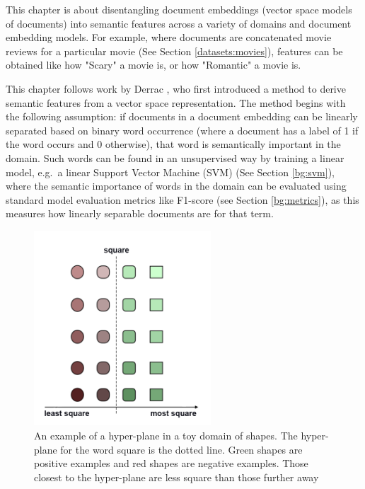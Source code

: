 
This chapter is about disentangling document embeddings (vector space models of documents) into semantic features across a variety of domains and document embedding models. For example, where documents are concatenated movie reviews for a particular movie (See Section \ref{datasets:movies}), features can be obtained like how "Scary" a movie is, or how "Romantic" a movie is.

This chapter follows work by Derrac \cite{Derrac2015}, who first introduced a method to derive semantic features from a vector space representation. The method begins with the following assumption: if documents in a document embedding  can be linearly separated based on binary word occurrence (where a document has a label of 1 if the word occurs and 0 otherwise), that word is semantically important in the domain. Such words can be found in an unsupervised way by training a linear model, e.g.\ a linear Support Vector Machine (SVM) (See Section \ref{bg:svm}), where the semantic importance of words  in the domain can be evaluated using standard model evaluation metrics like F1-score (see Section \ref{bg:metrics}), as this measures how linearly separable documents are for that term.

\begin{figure}[t]
	\includegraphics[width=250px]{images/Toyhyperplane1Direction.png}
	\centering
	\caption{An example of a hyper-plane in a toy domain of shapes. The hyper-plane for the word square is the dotted line. Green shapes are positive examples and red shapes are negative examples. Those closest to the hyper-plane are less square than those further away}\label{ch3:HyperPlaneNoDir}
\end{figure}


